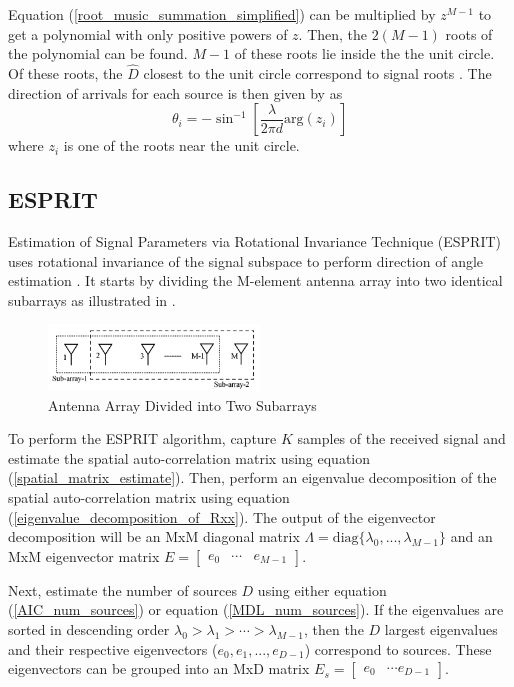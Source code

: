 \documentclass[conference]{IEEEtran}
\begin{document}
		Equation (\ref{root_music_summation_simplified}) can be multiplied by $z^{M-1}$ to get a polynomial with only positive powers of $z$. Then, the $2(M-1)$ roots of the polynomial can be found. $M - 1$ of these roots lie inside the the unit circle. Of these roots, the $\hat{D}$ closest to the unit circle correspond to signal roots \cite{root_music_eskandari}. The direction of arrivals for each source is then given by \cite{doa_algorithms_raghu} as 
		\begin{equation}
			\theta_i = -\sin^{-1}\left[\frac{\lambda}{2{\pi}d}\text{arg}(z_i)\right]
		\end{equation}
		where $z_i$ is one of the roots near the unit circle.
		
	\subsection{ESPRIT}
		
		Estimation of Signal Parameters via Rotational Invariance Technique (ESPRIT) uses rotational invariance of the signal subspace to perform direction of angle estimation \cite{root_music_ko}. It starts by dividing the M-element antenna array into two identical subarrays as illustrated in \cite{doa_algorithms_raghu}.
		
		\begin{figure}[H]
			\centerline{\includegraphics[width=0.5\textwidth]{esprit_doublets.png}}
			\caption{Antenna Array Divided into Two Subarrays \cite{doa_algorithms_raghu}}
			\label{esprit_subarrays}
		\end{figure}
		
		To perform the ESPRIT algorithm, capture $K$ samples of the received signal and estimate the spatial auto-correlation matrix using equation (\ref{spatial_matrix_estimate}). Then, perform an eigenvalue decomposition of the spatial auto-correlation matrix using equation (\ref{eigenvalue_decomposition_of_Rxx}). The output of the eigenvector decomposition will be an MxM diagonal matrix $\Lambda = \text{diag}\{\lambda_0, ..., \lambda_{M-1}\}$ and an MxM eigenvector matrix $E = \begin{bmatrix}e_0 & \cdots & e_{M-1}\end{bmatrix}$. 
		
		Next, estimate the number of sources $D$ using either equation (\ref{AIC_num_sources}) or equation (\ref{MDL_num_sources}). If the eigenvalues are sorted in descending order $\lambda_0 > \lambda_1 > \cdots > \lambda_{M-1}$, then the $D$ largest eigenvalues and their respective eigenvectors ($e_0, e_1, ..., e_{D-1}$) correspond to sources. These eigenvectors can be grouped into an MxD matrix $E_s = \begin{bmatrix} e_0 & \cdots e_{D-1} \end{bmatrix}$.
		
\end{document}
